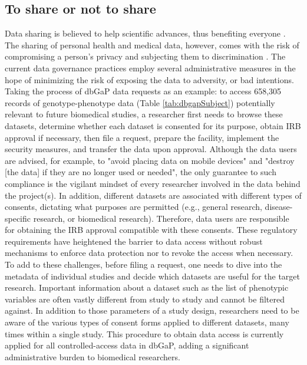 \documentclass[letter]{bib}
\newcounter{example}[subsection]
\begin{document}
	
	\subsection*{To share or not to share}
	Data sharing is believed to help scientific advances, thus benefiting everyone \citep{GA4GH:2014:Framework}. The sharing of personal health and medical data, however, comes with the risk of compromising a person's privacy and subjecting them to discrimination \citep{P3gConsortium:2009:Public,GA4GH:2014:Framework,Shringarpure:2015:Privacy}.  The current data governance practices employ several administrative measures in the hope of minimizing the risk of exposing the data to adversity, or bad intentions. Taking the process of dbGaP data requests as an example: to access 658,305 records of genotype-phenotype data (Table \ref{tab:dbgapSubject}) potentially relevant to future biomedical studies, a researcher first needs to browse these datasets, determine whether each dataset is consented for its purpose, obtain IRB approval if necessary, then file a request, prepare the facility, implement the security measures, and transfer the data upon approval. Although the data users are advised, for example, to "avoid placing data on mobile devices" and "destroy [the data] if they are no longer used or needed", the only guarantee to such compliance is the vigilant mindset of every researcher involved in the data behind the project(s).  In addition, different datasets are associated with different types of consents, dictating what purposes are permitted (e.g., general research, disease-specific research, or biomedical research). Therefore, data users are responsible for obtaining the IRB approval compatible with these consents. These regulatory requirements have heightened the barrier to data access without robust mechanisms to enforce data protection nor to revoke the access when necessary.  To add to these challenges, before filing a request, one needs to dive into the metadata of individual studies and decide which datasets are useful for the target research. Important information about a dataset such as the list of phenotypic variables are often vastly different from study to study and cannot be filtered against. In addition to those parameters of a study design, researchers need to be aware of the various types of consent forms applied to different datasets, many times within a single study. This procedure to obtain data access is currently applied for all controlled-access data in dbGaP, adding a significant administrative burden to biomedical researchers.
\end{document}
